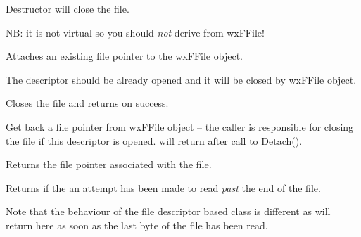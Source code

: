 




\label{wxffiledtor}


Destructor will close the file.

NB: it is not virtual so you should {\it not} derive from wxFFile!


\label{wxffileattach}


Attaches an existing file pointer to the wxFFile object.

The descriptor should be already opened and it will be closed by wxFFile
object.


\label{wxffileclose}


Closes the file and returns \true on success.


\label{wxffiledetach}


Get back a file pointer from wxFFile object -- the caller is responsible for closing the file if this
descriptor is opened.  will return \false after call to Detach().


\label{wxffilefp}


Returns the file pointer associated with the file.


\label{wxffileeof}


Returns \true if the an attempt has been made to read {\it past}
the end of the file. 

Note that the behaviour of the file descriptor based class
 is different as 
will return \true here as soon as the last byte of the file has been
read.

